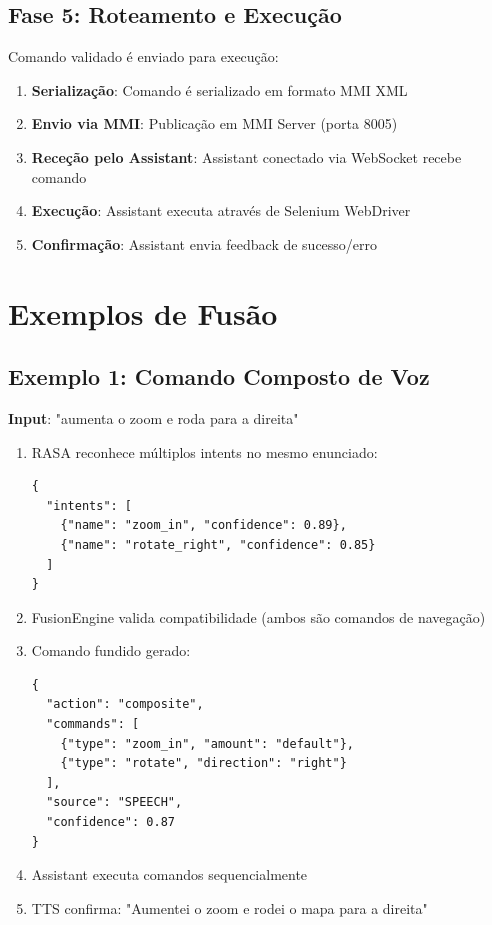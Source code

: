 \subsection{Fase 5: Roteamento e Execução}

Comando validado é enviado para execução:

\begin{enumerate}
    \item \textbf{Serialização}: Comando é serializado em formato MMI XML
    \item \textbf{Envio via MMI}: Publicação em MMI Server (porta 8005)
    \item \textbf{Receção pelo Assistant}: Assistant conectado via WebSocket recebe comando
    \item \textbf{Execução}: Assistant executa através de Selenium WebDriver
    \item \textbf{Confirmação}: Assistant envia feedback de sucesso/erro
\end{enumerate}

\section{Exemplos de Fusão}

\subsection{Exemplo 1: Comando Composto de Voz}

\textbf{Input}: "aumenta o zoom e roda para a direita"

\begin{enumerate}
    \item RASA reconhece múltiplos intents no mesmo enunciado:
    \begin{verbatim}
{
  "intents": [
    {"name": "zoom_in", "confidence": 0.89},
    {"name": "rotate_right", "confidence": 0.85}
  ]
}
    \end{verbatim}

    \item FusionEngine valida compatibilidade (ambos são comandos de navegação)

    \item Comando fundido gerado:
    \begin{verbatim}
{
  "action": "composite",
  "commands": [
    {"type": "zoom_in", "amount": "default"},
    {"type": "rotate", "direction": "right"}
  ],
  "source": "SPEECH",
  "confidence": 0.87
}
    \end{verbatim}

    \item Assistant executa comandos sequencialmente

    \item TTS confirma: "Aumentei o zoom e rodei o mapa para a direita"
\end{enumerate}

